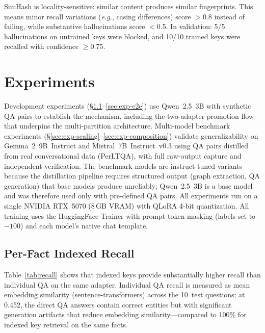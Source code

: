 \documentclass[11pt]{article}
\newcommand{\eg}{\textit{e.g.}}
\begin{document}
SimHash is locality-sensitive: similar content produces similar fingerprints.
This means minor recall variations (\eg, casing differences) score $>$0.8 instead of failing, while substantive hallucinations score $<$0.5.
In validation: 5/5 hallucinations on untrained keys were blocked, and 10/10 trained keys were recalled with confidence $\geq$0.75.

\section{Experiments}
\label{sec:experiments}

Development experiments (\S\ref{sec:exp-recall}--\ref{sec:exp-e2e}) use Qwen~2.5~3B with synthetic QA pairs to establish the mechanism, including the two-adapter promotion flow that underpins the multi-partition architecture.
Multi-model benchmark experiments (\S\ref{sec:exp-scaling}--\ref{sec:exp-composition}) validate generalizability on Gemma~2~9B~Instruct and Mistral~7B~Instruct~v0.3 using QA pairs distilled from real conversational data (PerLTQA), with full raw-output capture and independent verification.
The benchmark models are instruct-tuned variants because the distillation pipeline requires structured output (graph extraction, QA generation) that base models produce unreliably; Qwen~2.5~3B is a base model and was therefore used only with pre-defined QA pairs.
All experiments run on a single NVIDIA RTX~5070 (8\,GB VRAM) with QLoRA 4-bit quantization.
All training uses the HuggingFace Trainer with prompt-token masking (labels set to $-100$) and each model's native chat template.

\subsection{Per-Fact Indexed Recall}
\label{sec:exp-recall}

Table~\ref{tab:recall} shows that indexed keys provide substantially higher recall than individual QA on the same adapter.
Individual QA recall is measured as mean embedding similarity (sentence-transformers) across the 10~test questions; at 0.452, the direct QA answers contain correct entities but with significant generation artifacts that reduce embedding similarity---compared to 100\% for indexed key retrieval on the same facts.
\end{document}

